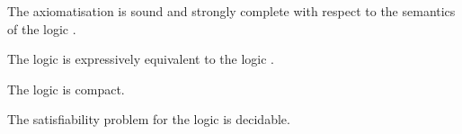 \begin{corollary}
The axiomatisation \axiomRamlS{} is sound and strongly complete with respect to the semantics of the logic \logicAamlS{}.
\end{corollary}

\begin{corollary}
The logic \logicAamlS{} is expressively equivalent to the logic \logicS{}.
\end{corollary}

\begin{corollary}
The logic \logicAamlS{} is compact.
\end{corollary}

\begin{corollary}
The satisfiability problem for the logic \logicAamlS{} is decidable.
\end{corollary}
